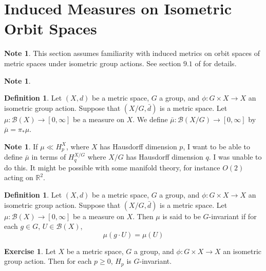 \documentclass{book}
\theoremstyle{definition}
\newtheorem{defn}[definition]{Definition}
\newtheorem{note}[definition]{Note}
\newtheorem{ex}[definition]{Exercise}
\newcommand{\R}{\mathbb{R}}
\newcommand{\MB}{\mathcal{B}}
\DeclareMathOperator*{\0}{\mbf{0}}
\DeclareMathOperator*{\1}{\mbf{1}}
\begin{document}
	
	
	
	
	
	
	
	
	
	
	
	
	
		
	\newpage
	\section{Induced Measures on Isometric Orbit Spaces}
	
	\begin{note}
	This section assumes familiarity with induced metrics on orbit spaces of metric spaces under isometric group actions. See section $9.1$ of \cite{analysis} for details. 
	\end{note}
	
	\begin{note}
	
	\end{note}
	
	\begin{defn}
	Let $(X, d)$ be a metric space, $G$ a group, and $\phi: G \times X \rightarrow X$ an isometric group action. Suppose that $(X/G, \bar{d})$ is a metric space. Let $\mu: \MB(X) \rightarrow [0, \infty]$ be a measure on $X$. We define $\bar{\mu}: \MB(X/G) \rightarrow [0, \infty]$ by $\bar{\mu} = \pi_* \mu$. 
	\end{defn}
	
	\begin{note}
	If $\mu \ll H_p^X$, where $X$ has Hausdorff dimension $p$, I want to be able to define $\bar{\mu}$ in terms of $H_q^{X/G}$ where $X/G$ has Hausdorff dimension $q$. I was unable to do this. It might be possible with some manifold theory, for instance $O(2)$ acting on $\R^2$.
	\end{note}
	
	\begin{defn}
	Let $(X, d)$ be a metric space, $G$ a group, and $\phi: G \times X \rightarrow X$ an isometric group action. Suppose that $(X/G, \bar{d})$ is a metric space. Let $\mu: \MB(X) \rightarrow [0, \infty]$ be a measure on $X$. Then $\mu$ is said to be $G$-invariant if for each $g \in G$, $U \in \MB(X)$, 
	\begin{equation*}
	\mu(g \cdot U) = \mu(U)
	\end{equation*}
	\end{defn}
	
	\begin{ex}
	Let $X$ be a metric space, $G$ a group, and $\phi: G \times X \rightarrow X$ an isometric group action. Then for each $p \geq 0$, $H_p$ is $G$-invariant. 
	\end{ex}	
	
\end{document}
